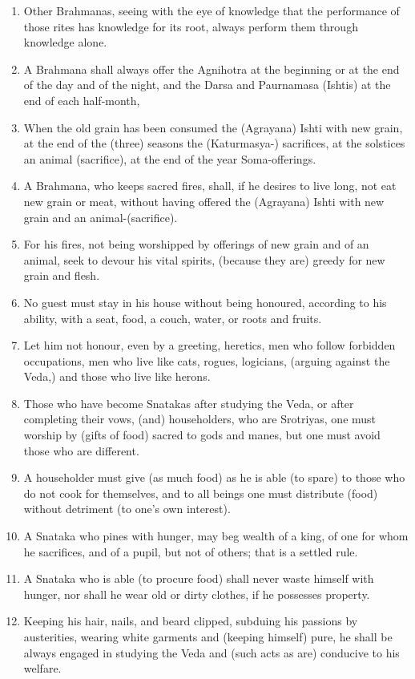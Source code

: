 \begin{enumerate}
\item Other Brahmanas, seeing with the eye of knowledge that the performance of those rites has knowledge for its root, always perform them through knowledge alone.
\item A Brahmana shall always offer the Agnihotra at the beginning or at the end of the day and of the night, and the Darsa and Paurnamasa (Ishtis) at the end of each half-month,
\item When the old grain has been consumed the (Agrayana) Ishti with new grain, at the end of the (three) seasons the (Katurmasya-) sacrifices, at the solstices an animal (sacrifice), at the end of the year Soma-offerings.
\item A Brahmana, who keeps sacred fires, shall, if he desires to live long, not eat new grain or meat, without having offered the (Agrayana) Ishti with new grain and an animal-(sacrifice).
\item For his fires, not being worshipped by offerings of new grain and of an animal, seek to devour his vital spirits, (because they are) greedy for new grain and flesh.
\item No guest must stay in his house without being honoured, according to his ability, with a seat, food, a couch, water, or roots and fruits.
\item Let him not honour, even by a greeting, heretics, men who follow forbidden occupations, men who live like cats, rogues, logicians, (arguing against the Veda,) and those who live like herons.
\item Those who have become Snatakas after studying the Veda, or after completing their vows, (and) householders, who are Srotriyas, one must worship by (gifts of food) sacred to gods and manes, but one must avoid those who are different.
\item A householder must give (as much food) as he is able (to spare) to those who do not cook for themselves, and to all beings one must distribute (food) without detriment (to one's own interest).
\item A Snataka who pines with hunger, may beg wealth of a king, of one for whom he sacrifices, and of a pupil, but not of others; that is a settled rule.
\item A Snataka who is able (to procure food) shall never waste himself with hunger, nor shall he wear old or dirty clothes, if he possesses property.
\item Keeping his hair, nails, and beard clipped, subduing his passions by austerities, wearing white garments and (keeping himself) pure, he shall be always engaged in studying the Veda and (such acts as are) conducive to his welfare.

\end{enumerate}
